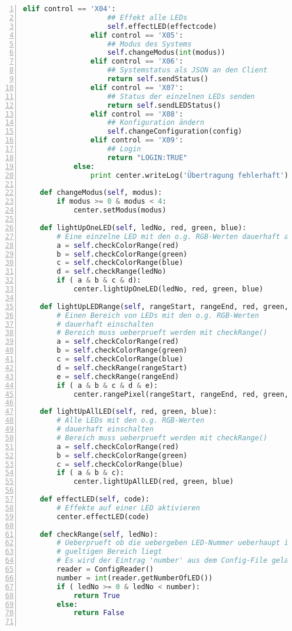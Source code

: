\begin{lstlisting}[caption =Implementierung des Nachrichten-Verarbeitung in Python, language=python, frame=single, breaklines=true,columns=fullflexible, commentstyle=\color{gray}\upshape, captionpos=b, numbers = left]
                elif control == 'X04':
                    ## Effekt alle LEDs
                    self.effectLED(effectcode)
                elif control == 'X05':
                    ## Modus des Systems
                    self.changeModus(int(modus))
                elif control == 'X06':
                    ## Systemstatus als JSON an den Client
                    return self.sendStatus()
                elif control == 'X07':
                    ## Status der einzelnen LEDs senden
                    return self.sendLEDStatus()
                elif control == 'X08':
                    ## Konfiguration ändern
                    self.changeConfiguration(config)
                elif control == 'X09':
                    ## Login
                    return "LOGIN:TRUE"
            else:
                print center.writeLog('Übertragung fehlerhaft')

    def changeModus(self, modus):
        if modus >= 0 & modus < 4:
            center.setModus(modus)

    def lightUpOneLED(self, ledNo, red, green, blue):
        # Eine einzelne LED mit den o.g. RGB-Werten dauerhaft anschalten
        a = self.checkColorRange(red)
        b = self.checkColorRange(green)
        c = self.checkColorRange(blue)
        d = self.checkRange(ledNo)
        if ( a & b & c & d):
            center.lightUpOneLED(ledNo, red, green, blue)

    def lightUpLEDRange(self, rangeStart, rangeEnd, red, green, blue):
        # Einen Bereich von LEDs mit den o.g. RGB-Werten
        # dauerhaft einschalten
        # Bereich muss ueberprueft werden mit checkRange()
        a = self.checkColorRange(red)
        b = self.checkColorRange(green)
        c = self.checkColorRange(blue)
        d = self.checkRange(rangeStart)
        e = self.checkRange(rangeEnd)
        if ( a & b & c & d & e):
            center.rangePixel(rangeStart, rangeEnd, red, green, blue)

    def lightUpAllLED(self, red, green, blue):
        # Alle LEDs mit den o.g. RGB-Werten
        # dauerhaft einschalten
        # Bereich muss ueberprueft werden mit checkRange()
        a = self.checkColorRange(red)
        b = self.checkColorRange(green)
        c = self.checkColorRange(blue)
        if ( a & b & c):
            center.lightUpAllLED(red, green, blue)

    def effectLED(self, code):
        # Effekte auf einer LED aktivieren
        center.effectLED(code)

    def checkRange(self, ledNo):
        # Ueberprueft ob die uebergeben LED-Nummer ueberhaupt im
        # gueltigen Bereich liegt
        # Es wird der Eintrag 'number' aus dem Config-File geladen
        reader = ConfigReader()
        number = int(reader.getNumberOfLED())
        if ( ledNo >= 0 & ledNo < number):
            return True
        else:
            return False


\end{lstlisting}
